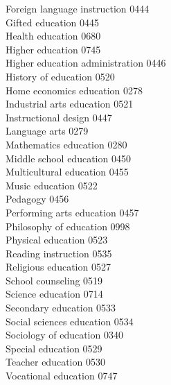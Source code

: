 \documentclass[9pt,twoside]{article}
\begin{document}
\begin{multicols}{3}
Foreign language instruction \hfill 0444 \leavevmode \\
Gifted education \hfill 0445 \leavevmode \\
Health education \hfill 0680 \leavevmode \\
Higher education \hfill 0745 \leavevmode \\
Higher education administration \hfill 0446 \leavevmode \\
History of education \hfill 0520 \leavevmode \\
Home economics education \hfill 0278 \leavevmode \\
Industrial arts education \hfill 0521 \leavevmode \\
Instructional design \hfill 0447 \leavevmode \\
Language arts \hfill 0279 \leavevmode \\
Mathematics education \hfill 0280 \leavevmode \\
Middle school education \hfill 0450 \leavevmode \\
Multicultural education \hfill 0455 \leavevmode \\
Music education \hfill 0522 \leavevmode \\
Pedagogy \hfill 0456 \leavevmode \\
Performing arts education \hfill 0457 \leavevmode \\
Philosophy of education \hfill 0998 \leavevmode \\
Physical education \hfill 0523 \leavevmode \\
Reading instruction \hfill 0535 \leavevmode \\
Religious education \hfill 0527 \leavevmode \\
School counseling \hfill 0519 \leavevmode \\
Science education \hfill 0714 \leavevmode \\
Secondary education \hfill 0533 \leavevmode \\
Social sciences education \hfill 0534 \leavevmode \\
Sociology of education \hfill 0340 \leavevmode \\
Special education \hfill 0529 \leavevmode \\
Teacher education \hfill 0530 \leavevmode \\
Vocational education \hfill 0747
\clearpage


\end{multicols}
\end{document}
